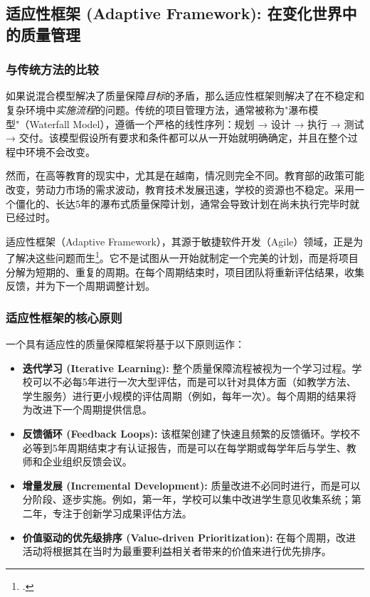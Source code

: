 



\subsection{适应性框架 (Adaptive Framework): 在变化世界中的质量管理}
\label{subsec:khung_thich_ung}

\subsubsection{与传统方法的比较}
如果说混合模型解决了质量保障\textit{目标}的矛盾，那么适应性框架则解决了在不稳定和复杂环境中\textit{实施流程}的问题。传统的项目管理方法，通常被称为"瀑布模型"（Waterfall Model），遵循一个严格的线性序列：规划 → 设计 → 执行 → 测试 → 交付。该模型假设所有要求和条件都可以从一开始就明确确定，并且在整个过程中环境不会改变。

然而，在高等教育的现实中，尤其是在越南，情况则完全不同。教育部的政策可能改变，劳动力市场的需求波动，教育技术发展迅速，学校的资源也不稳定。采用一个僵化的、长达5年的瀑布式质量保障计划，通常会导致计划在尚未执行完毕时就已经过时。

适应性框架（Adaptive Framework），其源于敏捷软件开发（Agile）领域，正是为了解决这些问题而生\footcite{Wysocki2009}。它不是试图从一开始就制定一个完美的计划，而是将项目分解为短期的、重复的周期。在每个周期结束时，项目团队将重新评估结果，收集反馈，并为下一个周期调整计划。

\subsubsection{适应性框架的核心原则}
一个具有适应性的质量保障框架将基于以下原则运作：
\begin{itemize}
    \item \textbf{迭代学习 (Iterative Learning):} 整个质量保障流程被视为一个学习过程。学校可以不必每5年进行一次大型评估，而是可以针对具体方面（如教学方法、学生服务）进行更小规模的评估周期（例如，每年一次）。每个周期的结果将为改进下一个周期提供信息。
    \item \textbf{反馈循环 (Feedback Loops):} 该框架创建了快速且频繁的反馈循环。学校不必等到5年周期结束才有认证报告，而是可以在每学期或每学年后与学生、教师和企业组织反馈会议。
    \item \textbf{增量发展 (Incremental Development):} 质量改进不必同时进行，而是可以分阶段、逐步实施。例如，第一年，学校可以集中改进学生意见收集系统；第二年，专注于创新学习成果评估方法。
    \item \textbf{价值驱动的优先级排序 (Value-driven Prioritization):} 在每个周期，改进活动将根据其在当时为最重要利益相关者带来的价值来进行优先排序。
\end{itemize}

